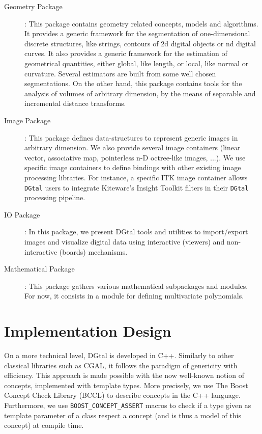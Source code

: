 \documentclass[11pt, a4paper]{article}
\def\DGtal{\texttt{DGtal} }
\begin{document}
\begin{description}
  \item[Geometry Package]: This package contains geometry related
    concepts, models and algorithms. It provides a generic framework
    for the segmentation of one-dimensional discrete structures, like
    strings, contours of 2d digital objects or nd digital curves. It
    also provides a generic framework for the estimation of
    geometrical quantities, either global, like length, or local, like
    normal or curvature. Several estimators are built from some well
    chosen segmentations. On the other hand, this package contains
    tools for the analysis of volumes of arbitrary dimension, by the
    means of separable and incremental distance transforms.


  \item[Image Package]: This package defines data-structures to
    represent generic images in arbitrary dimension. We also provide
    several image containers (linear vector, associative map,
    pointerless n-D octree-like images, ...). We use specific image
    containers to define bindings with other existing image processing
    libraries. For instance, a specific ITK image container allows
    \DGtal users to integrate Kiteware's Insight Toolkit filters in
    their \DGtal processing pipeline. 

  \item[IO Package]: In this package, we present DGtal tools and
    utilities to import/export images and visualize digital data using
    interactive (viewers) and non-interactive (boards) mechanisms.

  \item[Mathematical Package]: This package gathers various
    mathematical subpackages and modules. For now, it consists in a
    module for defining multivariate polynomials.
\end{description}

\section*{Implementation Design}

On a more technical level, DGtal is developed in C++. Similarly to
other classical libraries such as CGAL, it follows the paradigm of
genericity with efficiency. This approach is made possible with the
now well-known notion of concepts, implemented with template types.
More precisely, we use The Boost Concept Check Library (BCCL) to
describe concepts in the C++ language. Furthermore, we use
\texttt{BOOST\_CONCEPT\_ASSERT} macros to check if a type
given as template parameter of a class respect a concept (and is thus
a model of this concept) at compile time. 
\end{document}
